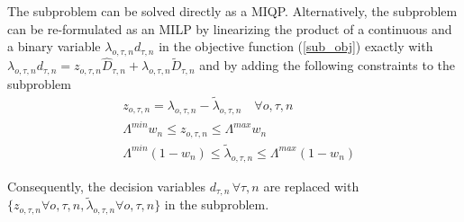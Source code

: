 The subproblem can be solved directly as a MIQP. Alternatively, the subproblem can be re-formulated as an MILP by linearizing the product of a continuous and a binary variable $\lambda_{o, \tau, n} d_{\tau, n}$ in the objective function (\ref{sub_obj}) exactly with $\lambda_{o, \tau, n} d_{\tau, n} = z_{o, \tau, n} \hat{D}_{\tau, n} + \lambda_{o, \tau, n} \tilde{D}_{\tau, n}$ and by adding the following constraints to the subproblem
\begin{align}
&z_{o, \tau, n} = \lambda_{o, \tau, n} - \tilde{\lambda}_{o, \tau, n} \quad \forall o, \tau, n \\
&\Lambda^{min} w_n \leq z_{o, \tau, n} \leq \Lambda^{max} w_n \\
&\Lambda^{min} (1 - w_n) \leq \tilde{\lambda}_{o, \tau, n} \leq \Lambda^{max} (1 - w_n)
\end{align}

Consequently, the decision variables $d_{\tau, n} \, \forall \tau, n$ are replaced with $\{ z_{o, \tau, n} \forall o, \tau, n, \tilde{\lambda}_{o, \tau, n} \forall o, \tau, n \}$ in the subproblem.
